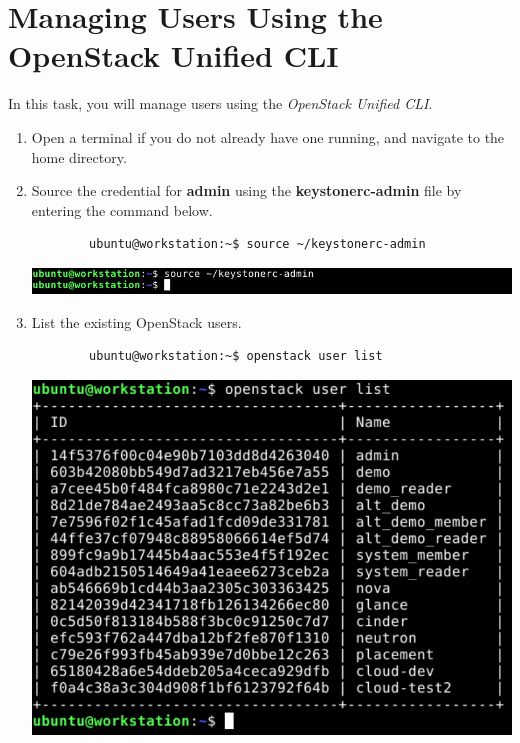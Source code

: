\documentclass[letterpaper, 12pt]{article}
\begin{document}
\section{Managing Users Using the OpenStack Unified CLI}
\label{sec:managing_users_using_the_openstack_unified_cli}
In this task, you will manage users using the \textit{OpenStack Unified CLI}.

\begin{enumerate}
    \item Open a terminal if you do not already have one running, and navigate to the home directory.
    
    \item Source the credential for \textbf{admin} using the \textbf{keystonerc-admin} file by entering the command
    below.
    \begin{lstlisting}
        ubuntu@workstation:~$ source ~/keystonerc-admin
    \end{lstlisting}

    \begin{center}
        \includegraphics[width=\linewidth]{images/part4/step2.png}
    \end{center}

    \item List the existing OpenStack users.
    \begin{lstlisting}
        ubuntu@workstation:~$ openstack user list
    \end{lstlisting}

    \begin{center}
        \includegraphics[width=\linewidth]{images/part4/step3.png}
    \end{center}


\end{enumerate}
\end{document}
